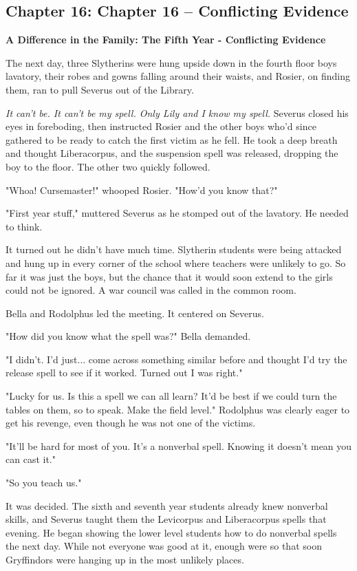 \documentclass[a4paper,11pt]{article}
\begin{document}
\subsection{Chapter 16: Chapter 16 – Conflicting Evidence}

\textbf{A Difference in the Family: The Fifth Year - Conflicting Evidence}

The next day, three Slytherins were hung upside down in the fourth floor boys lavatory, their robes and gowns falling around their waists, and Rosier, on finding them, ran to pull Severus out of the Library.

\emph{It can't be. It can't be my spell. Only Lily and I know my spell.} Severus closed his eyes in foreboding, then instructed Rosier and the other boys who'd since gathered to be ready to catch the first victim as he fell. He took a deep breath and thought Liberacorpus, and the suspension spell was released, dropping the boy to the floor. The other two quickly followed.

"Whoa! Cursemaster!" whooped Rosier. "How'd you know that?"

"First year stuff," muttered Severus as he stomped out of the lavatory. He needed to think.

It turned out he didn't have much time. Slytherin students were being attacked and hung up in every corner of the school where teachers were unlikely to go. So far it was just the boys, but the chance that it would soon extend to the girls could not be ignored. A war council was called in the common room.

Bella and Rodolphus led the meeting. It centered on Severus.

"How did you know what the spell was?" Bella demanded.

"I didn't. I'd just... come across something similar before and thought I'd try the release spell to see if it worked. Turned out I was right."

"Lucky for us. Is this a spell we can all learn? It'd be best if we could turn the tables on them, so to speak. Make the field level." Rodolphus was clearly eager to get his revenge, even though he was not one of the victims.

"It'll be hard for most of you. It's a nonverbal spell. Knowing it doesn't mean you can cast it."

"So you teach us."

It was decided. The sixth and seventh year students already knew nonverbal skills, and Severus taught them the Levicorpus and Liberacorpus spells that evening. He began showing the lower level students how to do nonverbal spells the next day. While not everyone was good at it, enough were so that soon Gryffindors were hanging up in the most unlikely places.
\end{document}
